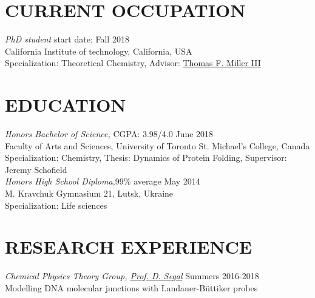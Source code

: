 \documentclass[9pt, margin]{res}
\begin{document}
\begin{resume}

 
\section{CURRENT OCCUPATION}

{\sl PhD student} \hfill start date: Fall 2018 \\
California Institute of technology, California, USA\\
Specialization: Theoretical Chemistry, Advisor: \href{https://millergroup.caltech.edu/Miller_Group/people/}{Thomas F. Miller III}\\

\section{EDUCATION}

{\sl Honors Bachelor of Science,} \hfill CGPA: 3.98/4.0 \hfill June 2018 \\
Faculty of Arts and Sciences, University of Toronto St. Michael's College, Canada \\
Specialization: Chemistry, Thesis: Dynamics of Protein Folding, Supervisor: Jeremy Schofield\\

 
{\sl Honors High School Diploma,}\hfill 99\% average \hfill  May 2014\\
M. Kravchuk Gymnasium 21, Lutsk, Ukraine\\
Specialization: Life sciences\\
 
 
\section{RESEARCH EXPERIENCE}

{\sl Chemical Physics Theory Group, \href{http://www.chem.utoronto.ca/~dsegal/index.html}{Prof. D. Segal}} \hfill Summers 2016-2018 \\
Modelling DNA molecular junctions with Landauer-B\"uttiker probes


\end{resume}
\end{document}
